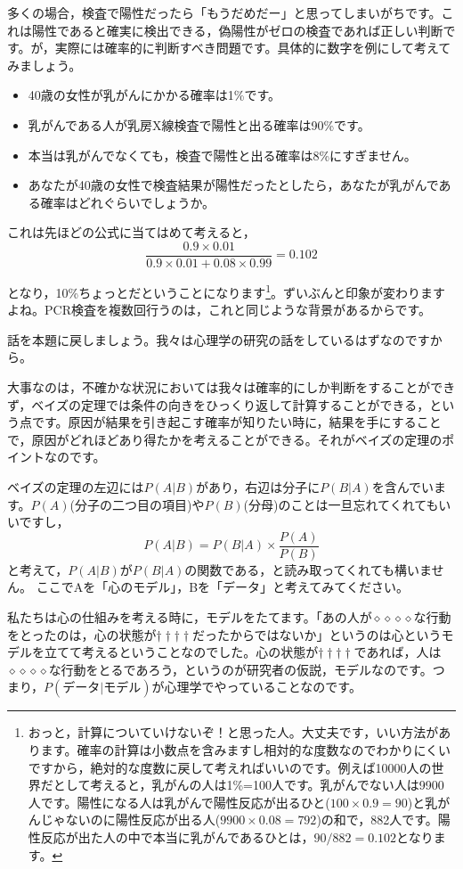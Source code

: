 \documentclass{ltjsarticle}
\begin{document}
多くの場合，検査で陽性だったら「もうだめだー」と思ってしまいがちです。これは陽性であると確実に検出できる，偽陽性がゼロの検査であれば正しい判断です。が，実際には確率的に判断すべき問題です。具体的に数字を例にして考えてみましょう。

\begin{itemize}
    \item 40歳の女性が乳がんにかかる確率は1\%です。
    \item 乳がんである人が乳房X線検査で陽性と出る確率は90\%です。
    \item 本当は乳がんでなくても，検査で陽性と出る確率は8\%にすぎません。
    \item あなたが40歳の女性で検査結果が陽性だったとしたら，あなたが乳がんである確率はどれぐらいでしょうか。
\end{itemize}
これは先ほどの公式に当てはめて考えると，
$$\frac{0.9\times0.01}{0.9\times0.01+0.08\times0.99}=0.102 $$

となり，10\%ちょっとだということになります\footnote{おっと，計算についていけないぞ！と思った人。大丈夫です，いい方法があります。確率の計算は小数点を含みますし相対的な度数なのでわかりにくいですから，絶対的な度数に戻して考えればいいのです。例えば10000人の世界だとして考えると，乳がんの人は1\%=100人です。乳がんでない人は9900人です。陽性になる人は乳がんで陽性反応が出るひと($100\times0.9=90$)と乳がんじゃないのに陽性反応が出る人($9900\times0.08=792$)の和で，882人です。陽性反応が出た人の中で本当に乳がんであるひとは，$90/882=0.102$となります。}。ずいぶんと印象が変わりますよね。PCR検査を複数回行うのは，これと同じような背景があるからです。

話を本題に戻しましょう。我々は心理学の研究の話をしているはずなのですから。

大事なのは，不確かな状況においては我々は確率的にしか判断をすることができず，ベイズの定理では条件の向きをひっくり返して計算することができる，という点です。原因が結果を引き起こす確率が知りたい時に，結果を手にすることで，原因がどれほどあり得たかを考えることができる。それがベイズの定理のポイントなのです。

ベイズの定理の左辺には$P(A|B)$があり，右辺は分子に$P(B|A)$を含んでいます。$P(A)$(分子の二つ目の項目)や$P(B)$(分母)のことは一旦忘れてくれてもいいですし，
$$ P(A|B) = P(B|A) \times \frac{P(A)}{P(B)}$$
と考えて，$P(A|B)$が$P(B|A)$の関数である，と読み取ってくれても構いません。
ここでAを「心のモデル」，Bを「データ」と考えてみてください。

私たちは心の仕組みを考える時に，モデルをたてます。「あの人が$\diamond\diamond\diamond\diamond$な行動をとったのは，心の状態が$\dagger\dagger\dagger\dagger$だったからではないか」というのは心というモデルを立てて考えるということなのでした。心の状態が$\dagger\dagger\dagger\dagger$であれば，人は$\diamond\diamond\diamond\diamond$な行動をとるであろう，というのが研究者の仮説，モデルなのです。つまり，$P(\mbox{データ}|\mbox{モデル})$が心理学でやっていることなのです。
\end{document}

